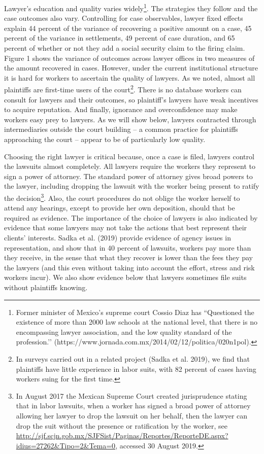 \documentclass[oneside,12pt]{article}
\begin{document}
Lawyer’s education and quality varies widely\footnote{Former minister of Mexico’s supreme court Cossio Diaz has “Questioned the existence of more than 2000 law schools at the national level, that there is no encompassing lawyer association, and the low quality standard of the profession.’’ (https://www.jornada.com.mx/2014/02/12/politica/020n1pol).}.  The strategies they follow and the case outcomes also vary. Controlling for case observables, lawyer fixed effects explain 44 percent of the variance of recovering a positive amount on a case, 45 percent of the variance in settlements, 49 percent of case duration, and 65 percent of whether or not they add a social security claim to the firing claim. Figure 1 shows the variance of outcomes across lawyer offices in two measures of the amount recovered in cases. However, under the current institutional structure it is hard for workers to ascertain the quality of lawyers. As we noted, almost all plaintiffs are first-time users of the court\footnote{In surveys carried out in a related project (Sadka et al. 2019), we find that plaintiffs have little experience in labor suits, with 82 percent of cases having workers suing for the first time.}.  There is no database workers can consult for lawyers and their outcomes, so plaintiff’s lawyers have weak incentives to acquire reputation. And finally, ignorance and overconfidence may make workers easy prey to lawyers. As we will show below, lawyers contracted through intermediaries outside the court building – a common practice for plaintiffs approaching the court – appear to be of particularly low quality.

Choosing the right lawyer is critical because, once a case is filed, lawyers control the lawsuits almost completely. All lawyers require the workers they represent to sign a power of attorney. The standard power of attorney gives broad powers to the lawyer, including dropping the lawsuit with the worker being present to ratify the decision\footnote{In August 2017 the Mexican Supreme Court created jurisprudence stating that in labor lawsuits, when a worker has signed a broad power of attorney allowing her lawyer to drop the lawsuit on her behalf, then the lawyer can drop the suit without the presence or ratification by the worker, see \url{http://sjf.scjn.gob.mx/SJFSist/Paginas/Reportes/ReporteDE.aspx?idius=27262&Tipo=2&Tema=0}, accessed 30 August 2019.}.  Also, the court procedures do not oblige the worker herself to attend any hearings, except to provide her own deposition, should that be required as evidence. The importance of the choice of lawyers is also indicated by evidence that some lawyers may not take the actions that best represent their clients’ interests. Sadka et al. (2019) provide evidence of agency issues in representation, and show that in 40 percent of lawsuits, workers pay more than they receive, in the sense that what they recover is lower than the fees they pay the lawyers (and this even without taking into account the effort, stress and risk workers incur). We also show evidence below that lawyers sometimes file suits without plaintiffs knowing. 
\end{document}
